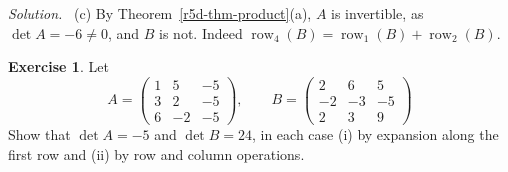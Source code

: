 \documentclass[12pt]{article}
\DeclareMathOperator{\row}{row}
\theoremstyle{definition}
\newtheorem{exercise}{Exercise}
\newenvironment{solution}{\par\noindent\textit{Solution.}\ }{\par\smallskip}
\begin{document}
\begin{solution}
(c) By Theorem~\ref{r5d-thm-product}(a), \(A\) is invertible, as \(\det A=-6\ne0\), and \(B\) is not. Indeed
\(\row_4(B)=\row_1(B)+\row_2(B)\).
\end{solution}

\begin{exercise}\label{r5d-ex-three-by-three}
Let
\[
A=\begin{pmatrix}1&5&-5\\3&2&-5\\6&-2&-5\end{pmatrix},\qquad B=\begin{pmatrix}2&6&5\\-2&-3&-5\\2&3&9\end{pmatrix}
\]
Show that \(\det A=-5\) and \(\det B=24\), in each case (i) by expansion along the first row and (ii) by row and
column operations.
\end{exercise}
\end{document}
